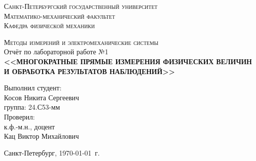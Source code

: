 \begin{titlepage}
\begin{center}
\textsc{Санкт-Петербургский государственный университет\\
Математико-механический факультет\\
Кафедра физической механики\\}

\vfill

\textsc{Методы измерений и электромеханические системы\\[3mm]}
Отчёт по лабораторной работе №1\\[6mm]


\textbf{\large<<МНОГОКРАТНЫЕ ПРЯМЫЕ ИЗМЕРЕНИЯ ФИЗИЧЕСКИХ
ВЕЛИЧИН И ОБРАБОТКА РЕЗУЛЬТАТОВ НАБЛЮДЕНИЙ>>}

\vfill
\end{center}

\hfill
\begin{minipage}{.5\textwidth}
Выполнил студент:\\[2mm] 
Косов Никита Сергеевич\\
группа: 24.С53-мм\\[5mm]

Проверил:\\[2mm] 
к.ф.-м.н., доцент\\
Кац Виктор Михайлович
\end{minipage}%
\vfill
\begin{center}
 Санкт-Петербург, \yeardate\today\ г.
\end{center}
\end{titlepage}